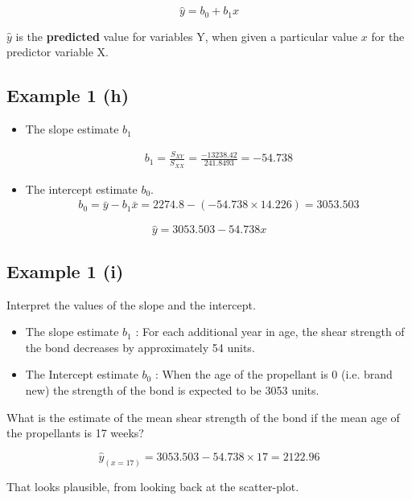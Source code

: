 \documentclass[]{report}
\begin{document}
\[ \hat{y}  = b_0 + b_1x \]

$\hat{y}$ is the \textbf{predicted} value for variables Y, when given a particular value $x$ for the predictor variable X.




\subsection{Example 1 (h)}

\begin{itemize}
	\item  The slope estimate $b_1$
	
	\begin{eqnarray*}
		b_1 = \frac{S_{XY}}{S_{XX}} = \frac{-13238.42}{241.8493} = -54.738
	\end{eqnarray*}
	
	\item  The intercept estimate $b_0$.
	\begin{eqnarray*}
		b_0 = \bar{y} -b_1\bar{x} = 2274.8 - (-54.738 \times 14.226) = 3053.503
	\end{eqnarray*}
\end{itemize}

\[ \hat{y}  = 3053.503 -54.738 x \]



\subsection{Example 1 (i)}
Interpret the values of the slope and the intercept.
\begin{itemize}
	\item  The slope estimate $b_1$ :  For each additional year in age, the shear strength of the bond decreases by approximately 54 units.
	\item The Intercept estimate $b_0$ : When the age of the propellant is 0 (i.e. brand new) the strength of the bond is expected to be 3053 units.
\end{itemize}
\bigskip
What is the estimate of the mean shear strength of the bond if the mean age of the propellants is 17 weeks?

\[ \hat{y}_{(x=17)}  = 3053.503 -54.738 \times 17 = 2122.96 \]

That looks plausible, from looking back at the scatter-plot.
\end{document}
